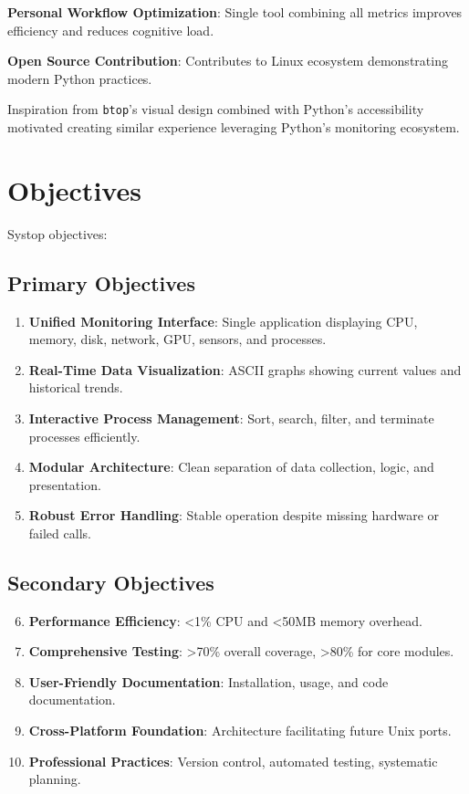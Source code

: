 \documentclass[12pt,a4paper,oneside]{report}
\begin{document}
\textbf{Personal Workflow Optimization}: Single tool combining all metrics improves efficiency and reduces cognitive load.

\textbf{Open Source Contribution}: Contributes to Linux ecosystem demonstrating modern Python practices.

Inspiration from \texttt{btop}'s visual design combined with Python's accessibility motivated creating similar experience leveraging Python's monitoring ecosystem.

\section{Objectives}
\label{sec:objectives}

Systop objectives:

\subsection{Primary Objectives}

\begin{enumerate}
    \item \textbf{Unified Monitoring Interface}: Single application displaying CPU, memory, disk, network, GPU, sensors, and processes.
    \item \textbf{Real-Time Data Visualization}: ASCII graphs showing current values and historical trends.
    \item \textbf{Interactive Process Management}: Sort, search, filter, and terminate processes efficiently.
    \item \textbf{Modular Architecture}: Clean separation of data collection, logic, and presentation.
    \item \textbf{Robust Error Handling}: Stable operation despite missing hardware or failed calls.
\end{enumerate}

\subsection{Secondary Objectives}

\begin{enumerate}
    \setcounter{enumi}{5}
    \item \textbf{Performance Efficiency}: <1\% CPU and <50MB memory overhead.
    \item \textbf{Comprehensive Testing}: >70\% overall coverage, >80\% for core modules.
    \item \textbf{User-Friendly Documentation}: Installation, usage, and code documentation.
    \item \textbf{Cross-Platform Foundation}: Architecture facilitating future Unix ports.
    \item \textbf{Professional Practices}: Version control, automated testing, systematic planning.
\end{enumerate}
\end{document}
